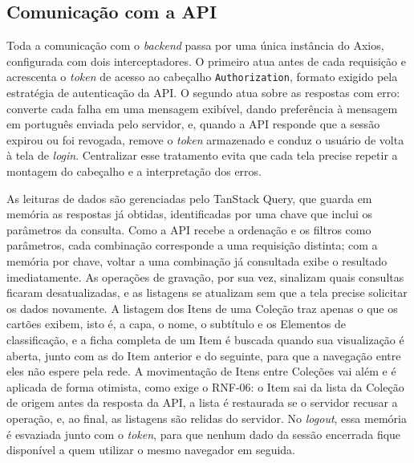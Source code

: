 \subsection{Comunicação com a API}

Toda a comunicação com o \textit{backend} passa por uma única instância do Axios, configurada com dois interceptadores. O primeiro atua antes de cada requisição e acrescenta o \textit{token} de acesso ao cabeçalho \texttt{Authorization}, formato exigido pela estratégia de autenticação da API. O segundo atua sobre as respostas com erro: converte cada falha em uma mensagem exibível, dando preferência à mensagem em português enviada pelo servidor, e, quando a API responde que a sessão expirou ou foi revogada, remove o \textit{token} armazenado e conduz o usuário de volta à tela de \textit{login}. Centralizar esse tratamento evita que cada tela precise repetir a montagem do cabeçalho e a interpretação dos erros.

As leituras de dados são gerenciadas pelo TanStack Query, que guarda em memória as respostas já obtidas, identificadas por uma chave que inclui os parâmetros da consulta. Como a API recebe a ordenação e os filtros como parâmetros, cada combinação corresponde a uma requisição distinta; com a memória por chave, voltar a uma combinação já consultada exibe o resultado imediatamente. As operações de gravação, por sua vez, sinalizam quais consultas ficaram desatualizadas, e as listagens se atualizam sem que a tela precise solicitar os dados novamente. A listagem dos Itens de uma Coleção traz apenas o que os cartões exibem, isto é, a capa, o nome, o subtítulo e os Elementos de classificação, e a ficha completa de um Item é buscada quando sua visualização é aberta, junto com as do Item anterior e do seguinte, para que a navegação entre eles não espere pela rede. A movimentação de Itens entre Coleções vai além e é aplicada de forma otimista, como exige o RNF-06: o Item sai da lista da Coleção de origem antes da resposta da API, a lista é restaurada se o servidor recusar a operação, e, ao final, as listagens são relidas do servidor. No \textit{logout}, essa memória é esvaziada junto com o \textit{token}, para que nenhum dado da sessão encerrada fique disponível a quem utilizar o mesmo navegador em seguida.

